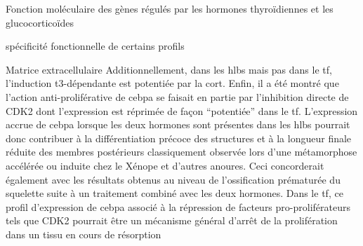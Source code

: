 \documentclass[../main.tex]{subfiles}
\begin{document}
\begin{chapter}{Fonction moléculaire des gènes régulés par les hormones thyroïdiennes et les glucocorticoïdes}
\begin{section}{spécificité fonctionnelle de certains profils}
\begin{subsection}{Matrice extracellulaire}
Additionnellement, dans les \glspl{hlb} mais pas dans le \gls{tf}, l'induction \gls{t3}-dépendante est potentiée par la \gls{cort}.
Enfin, il a été montré que l'action anti-proliférative de \gls{cebpa} se faisait en partie par l'inhibition directe de CDK2 \citep{Wang2001} dont l'expression est réprimée de façon ``potentiée'' dans le \gls{tf}.
L'expression accrue de \gls{cebpa} lorsque les deux hormones sont présentes dans les \glspl{hlb} pourrait donc contribuer à la différentiation précoce des structures et à la longueur finale réduite des membres postérieurs classiquement observée lors d'une métamorphose accélérée ou induite chez le Xénope \citep{Gomez-Mestre2013a} et d'autres anoures.
Ceci concorderait également avec les résultats obtenus au niveau de l'ossification prématurée du squelette suite à un traitement combiné avec les deux hormones.
Dans le \gls{tf}, ce profil d'expression de \gls{cebpa} associé à la répression de facteurs pro-proliférateurs tels que CDK2 pourrait être un mécanisme général d’arrêt de la prolifération dans un tissu en cours de résorption
\end{subsection}



\end{section}
\end{chapter}
\end{document}
